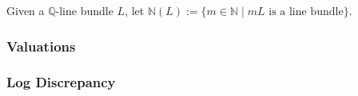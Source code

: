 

Given a $\mathbb{Q}$-line bundle $L$, let $\mathbb{N}(L) := \{m \in \mathbb{N} \mid m L \text{ is a line bundle}\}$.

\subsubsection{Valuations}\label{sec:prelim:bir:val}


\subsubsection{Log Discrepancy}\label{sec:prelim:bir:dis}


